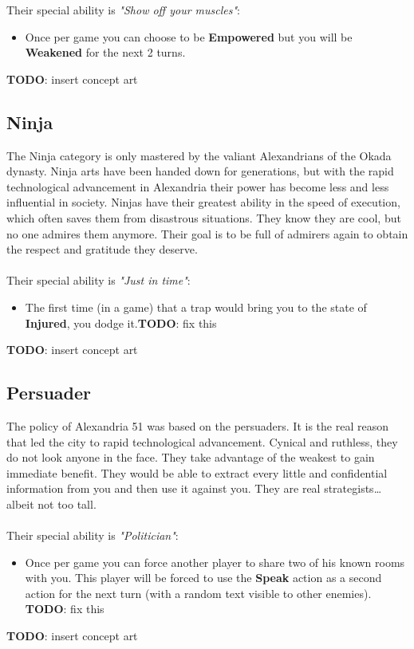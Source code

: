 Their special ability is \textit{"Show off your muscles"}:
\begin{itemize}
\item Once per game you can choose to be \textbf{Empowered} but you will be \textbf{Weakened} for the next 2 turns.
\end{itemize}
\textbf{TODO}: insert concept art

\subsection{Ninja}
The Ninja category is only mastered by the valiant Alexandrians of the Okada dynasty. Ninja arts have been handed down for generations, but with the rapid technological advancement in Alexandria their power has become less and less influential in society. Ninjas have their greatest ability in the speed of execution, which often saves them from disastrous situations. They know they are cool, but no one admires them anymore. Their goal is to be full of admirers again to obtain the respect and gratitude they deserve.\\\\
Their special ability is \textit{"Just in time"}:
\begin{itemize}
\item The first time (in a game) that a trap would bring you to the state of \textbf{Injured}, you dodge it.\textbf{TODO}: fix this
\end{itemize}
\textbf{TODO}: insert concept art
\subsection{Persuader}

The policy of Alexandria 51 was based on the persuaders. It is the real reason that led the city to rapid technological advancement. Cynical and ruthless, they do not look anyone in the face. They take advantage of the weakest to gain immediate benefit. They would be able to extract every little and confidential information from you and then use it against you. They are real strategists… albeit not too tall.\\\\
Their special ability is \textit{"Politician"}:
\begin{itemize}
\item Once per game you can force another player to share two of his known rooms with you. This player will be forced to use the \textbf{Speak} action as a second action for the next turn (with a random text visible to other enemies). \textbf{TODO}: fix this
\end{itemize}
\textbf{TODO}: insert concept art






\pagebreak 